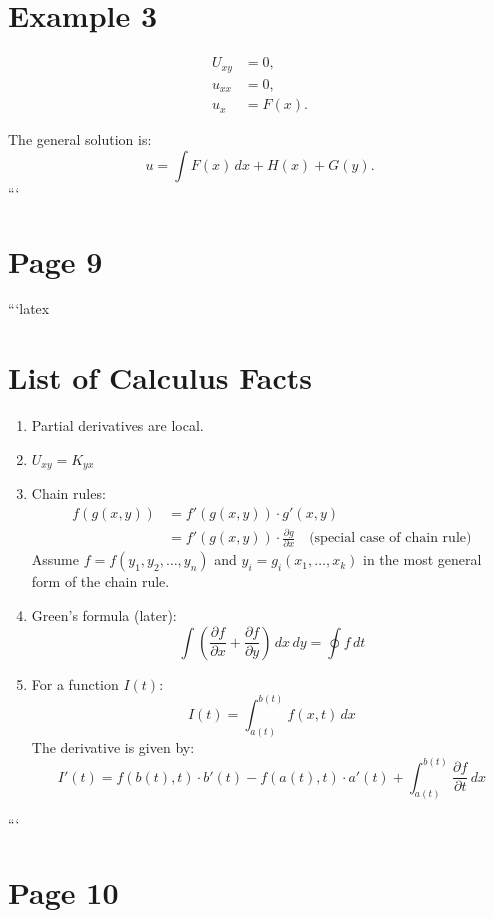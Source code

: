 \documentclass[11pt]{article}
\begin{document}
\section*{Example 3}

\begin{align}
    U_{xy} &= 0, \\
    u_{xx} &= 0, \\
    u_x &= F(x).
\end{align}

The general solution is:
\[
u = \int F(x) \, dx + H(x) + G(y).
\]
```
\clearpage
\section*{Page 9}

```latex
\section*{List of Calculus Facts}

\begin{enumerate}
    \item Partial derivatives are local.
    
    \item $U_{xy} = K_{yx}$
    
    \item Chain rules:
    \begin{align*}
        f(g(x, y)) &= f'(g(x, y)) \cdot g'(x, y) \\
        &= f'(g(x, y)) \cdot \frac{\partial g}{\partial x} \quad \text{(special case of chain rule)}
    \end{align*}
    Assume $f = f(y_1, y_2, \ldots, y_n)$ and $y_i = g_i(x_1, \ldots, x_k)$ in the most general form of the chain rule.
    
    \item Green's formula (later):
    \[
    \int \left( \frac{\partial f}{\partial x} + \frac{\partial f}{\partial y} \right) \, dx \, dy = \oint f \, dt
    \]
    
    \item For a function $I(t)$:
    \[
    I(t) = \int_{a(t)}^{b(t)} f(x, t) \, dx
    \]
    The derivative is given by:
    \[
    I'(t) = f(b(t), t) \cdot b'(t) - f(a(t), t) \cdot a'(t) + \int_{a(t)}^{b(t)} \frac{\partial f}{\partial t} \, dx
    \]
\end{enumerate}
```
\clearpage
\section*{Page 10}
\end{document}
